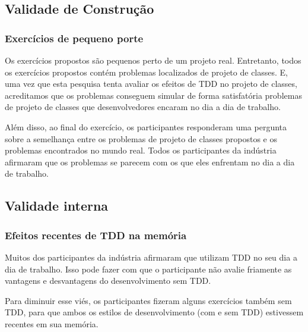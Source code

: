 \documentclass[conference]{IEEEtran}
\begin{document}
\subsection{Validade de Construção}

\subsubsection{Exercícios de pequeno porte}

Os exercícios propostos são pequenos perto de um projeto real. Entretanto, todos os exercícios propostos contém
problemas localizados de projeto de classes. E, uma vez que esta pesquisa tenta avaliar os 
efeitos de TDD no projeto de classes, 
acreditamos que os problemas conseguem simular de forma satisfatória
problemas de projeto de classes que desenvolvedores encaram no dia a dia de trabalho.

Além disso, ao final do exercício, os participantes responderam uma pergunta sobre a semelhança
entre os problemas de projeto de classes propostos e os problemas encontrados no mundo real.
Todos os participantes da indústria afirmaram que os problemas se parecem com os que eles enfrentam
no dia a dia de trabalho. 

\subsection{Validade interna}

\subsubsection{Efeitos recentes de TDD na memória}

Muitos dos participantes da indústria afirmaram que utilizam TDD no seu dia a dia de trabalho.
Isso pode fazer com que o participante
não avalie friamente as vantagens e desvantagens do desenvolvimento sem TDD. 

Para diminuir esse viés, os participantes fizeram alguns exercícios também
sem TDD, para que ambos os estilos de desenvolvimento (com e sem TDD) estivessem
recentes em sua memória.

\end{document}
